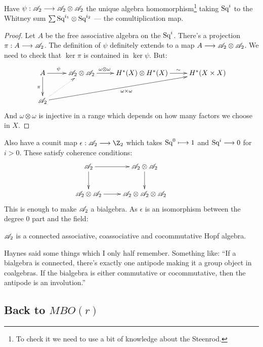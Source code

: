 \documentclass[11pt]{article}
\begin{document}
\begin{JeremyThomTalk}
\begin{prop*}
Have $\psi:\mathscr{A}_2\longrightarrow\mathscr{A}_2\otimes\mathscr{A}_2$ the unique algebra homomorphism\footnote{To check it we need to use a bit of knowledge about the Steenrod.} taking $\textup{Sq}^i$ to the Whitney sum $\sum \textup{Sq}^{i_1}\otimes\textup{Sq}^{i_2}$ --- the comultiplication map.
\end{prop*}
\begin{proof}
Let $A$ be the free associative algebra on the $\textup{Sq}^i$. There's a projection $\pi:A\longrightarrow\mathscr{A}_2$. The definition of $\psi$ definitely extends to a map $A\longrightarrow\mathscr{A}_2\otimes\mathscr{A}_2$. We need to check that $\ker\pi$ is contained in $\ker\psi$. But:
\[\xymatrix{
A\ar[r]^{\psi\quad}\ar[d]_\pi&\Steen\otimes\Steen\ar[r]^{\omega\otimes\omega\qquad}&H^*(X)\otimes H^*(X)\ar[r]^{\quad\sim}&H^*(X\times X)\\
\Steen\ar[rrru]_{\omega\times\omega}\ar@{..>}[ur]
}\]
And $\omega\otimes\omega$ is injective in a range which depends on how many factors we choose in $X$.
\end{proof}
Also have a counit map $\epsilon:\Steen\to\Z_2$ which takes $\textup{Sq}^0\longmapsto 1$ and $\textup{Sq}^i\longrightarrow0$ for $i>0$. These satisfy coherence conditions:
\[\xymatrix{\Steen\ar[r]\ar[d]&\Steen\otimes\Steen\ar[d]&\\
\Steen\otimes\Steen\ar[r]&\Steen\otimes\Steen\otimes\Steen}\]
This is enough to make $\mathscr{A}_2$ a bialgebra. As $\epsilon$ is an isomorphism between the degree 0 part and the field:
\begin{fact*}
$\mathscr{A}_2$ is a connected associative, coassociative and cocommutative Hopf algebra.
\end{fact*}
\begin{rmk*}
Haynes said some things which I only half remember. Something like:
``If a bialgebra is connected, there's exactly one antipode making it a group object in coalgebras. If the bialgebra is either commutative or cocommutative, then the antipode is an involution.''

\end{rmk*}
\noindent 
\subsection*{Back to $MBO(r)$}


\end{JeremyThomTalk}
\end{document}
